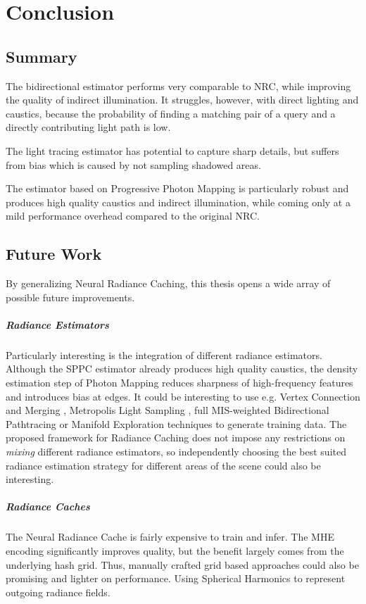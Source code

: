 
\chapter{Conclusion}
\label{chap:conclusion}

\section{Summary}
The bidirectional estimator performs very comparable to NRC, while improving the quality of indirect illumination.
It struggles, however, with direct lighting and caustics, because the probability of finding a matching pair of a query and a directly contributing light path is low.

The light tracing estimator has potential to capture sharp details, but suffers from bias which is caused by not sampling shadowed areas.

The estimator based on Progressive Photon Mapping is particularly robust and produces high quality caustics and indirect illumination, while coming only at a mild performance overhead compared to the original NRC.

\section{Future Work}
By generalizing Neural Radiance Caching, this thesis opens a wide array of possible future improvements.

\paragraph{Radiance Estimators}
Particularly interesting is the integration of different radiance estimators.
Although the SPPC estimator already produces high quality caustics, the density estimation step of Photon Mapping reduces sharpness of high-frequency features and introduces bias at edges.
It could be interesting to use e.g. Vertex Connection and Merging \parencite{georgiev2012}, Metropolis Light Sampling \parencite{veach1997a}, full MIS-weighted Bidirectional Pathtracing \parencite{lafortune1993,veach1997} or Manifold Exploration techniques \parencite{jakob2012} to generate training data.
The proposed framework for Radiance Caching does not impose any restrictions on \emph{mixing} different radiance estimators, so independently choosing the best suited radiance estimation strategy for different areas of the scene could also be interesting.

\paragraph{Radiance Caches}
The Neural Radiance Cache is fairly expensive to train and infer.
The MHE encoding significantly improves quality, but the benefit largely comes from the underlying hash grid.
Thus, manually crafted grid based approaches could also be promising and lighter on performance.
Using Spherical Harmonics to represent outgoing radiance fields.

